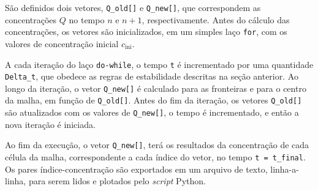 São definidos dois vetores, \verb|Q_old[]| e \verb|Q_new[]|, que correspondem
as concentrações $Q$ no tempo $n$ e $n+1$, respectivamente. Antes do cálculo
das concentrações, os vetores são inicializados, em um simples laço \verb|for|,
com os valores de concentração inicial $c_\text{ini}$.

A cada iteração do laço \verb|do-while|, o tempo \verb|t| é incrementado por
uma quantidade \verb|Delta_t|, que obedece as regras de estabilidade descritas
na seção anterior. Ao longo da iteração, o vetor \verb|Q_new[]| é calculado
para as fronteiras e para o centro da malha, em função de \verb|Q_old[]|. Antes
do fim da iteração, os vetores \verb|Q_old[]| são atualizados com os valores de
\verb|Q_new[]|, o tempo é incrementado, e então a nova iteração é iniciada.

Ao fim da execução, o vetor \verb|Q_new[]|, terá os resultados da concentração
de cada célula da malha, correspondente a cada índice do vetor, no tempo
\verb|t = t_final|. Os pares índice-concentração são exportados em um arquivo
de texto, linha-a-linha, para serem lidos e plotados pelo \textit{script}
Python.
